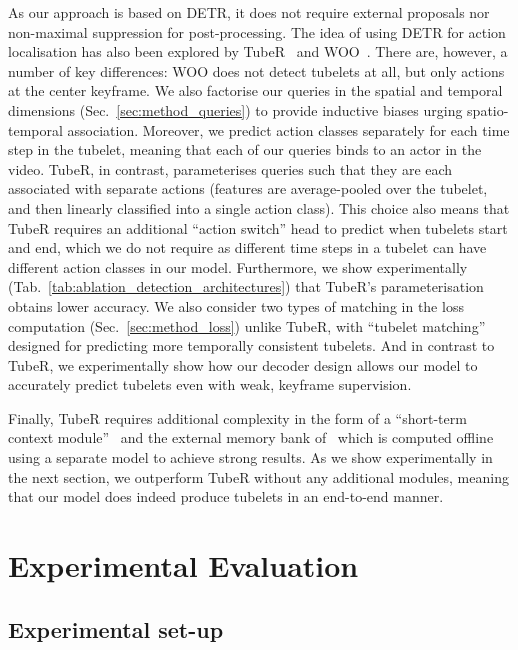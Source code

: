 \documentclass[10pt,twocolumn,letterpaper]{article}
\begin{document}
As our approach is based on DETR, it does not require external proposals nor non-maximal suppression for post-processing.
The idea of using DETR for action localisation has also been explored by TubeR~\cite{zhao2022tuber} and WOO~\cite{chen2021watch}.
There are, however, a number of key differences:
WOO does not detect tubelets at all, but only actions at the center keyframe. We also factorise our queries in the spatial and temporal dimensions (Sec.~\ref{sec:method_queries}) to provide inductive biases urging spatio-temporal association. Moreover, we predict action classes separately for each time step in the tubelet, meaning that each of our queries binds to an actor in the video. TubeR, in contrast, parameterises queries such that they are each associated with separate actions (features are average-pooled over the tubelet, and then linearly classified into a single action class).
This choice also means that TubeR requires an additional ``action switch'' head to predict when tubelets start and end, which we do not require as different time steps in a tubelet can have different action classes in our model.
Furthermore, we show experimentally (Tab.~\ref{tab:ablation_detection_architectures}) that TubeR's parameterisation obtains lower accuracy.
We also consider two types of matching in the loss computation (Sec.~\ref{sec:method_loss}) unlike TubeR, with ``tubelet matching'' designed for predicting more temporally consistent tubelets.
And in contrast to TubeR, we experimentally show how our decoder design allows our model to accurately predict tubelets even with weak, keyframe supervision. 

Finally, TubeR requires additional complexity in the form of a ``short-term context module''~\cite{zhao2022tuber} and the external memory bank of~\cite{wu_cvpr_2019} which is computed offline using a separate model to achieve strong results.
As we show experimentally in the next section, we outperform TubeR without any additional modules, meaning that our model does indeed produce tubelets in an end-to-end manner.





 \section{Experimental Evaluation}

\subsection{Experimental set-up}
\end{document}
